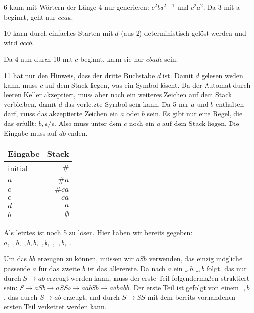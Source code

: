 \documentclass{article}
\begin{document}
\bigskip

6 kann mit Wörtern der Länge 4 nur generieren: $c^2ba^{2-1}$ und $c^2a^2$. Da 3 mit a beginnt, geht nur $ccaa$.

\bigskip

10 kann durch einfaches Starten mit $d$ (aus 2) deterministisch gelöst werden und wird $dccb$.

\bigskip

Da 4 nun durch 10 mit $c$ beginnt, kann sie nur $cbadc$ sein.

\bigskip

11 hat nur den Hinweis, dass der dritte Buchstabe $d$ ist. Damit $d$ gelesen weden kann, muss $c$ auf dem Stack liegen, was ein Symbol löscht. Da der Automat durch leeren Keller akzeptiert, muss aber noch ein weiteres Zeichen auf dem Stack verbleiben, damit $d$ das vorletzte Symbol sein kann. Da 5 nur $a$ und $b$ enthalten darf, muss das akzeptierte Zeichen ein $a$ oder $b$ sein. Es gibt nur eine Regel, die das erfüllt: $b,a/\epsilon$. Also muss unter dem $c$ noch ein $a$ auf dem Stack liegen. Die Eingabe muss auf $db$ enden.

\begin{table*}[ht]
	\centering
		\begin{tabular}{l|r}
      Eingabe & Stack \\
      \hline
      initial & $\#$ \\
      $a$ & $\# a$ \\
      $c$ & $\# ca$ \\
      $\epsilon$ & $ca$ \\
      $d$ & $a$ \\
      $b$ & $\emptyset$
		\end{tabular}
\end{table*}

\bigskip

Als letztes ist noch 5 zu lösen. Hier haben wir bereits gegeben: \\ $a,\_,b,\_,b,b,\_,b,\_,\_,b,\_$. 

Um das $bb$ erzeugen zu können, müssen wir $aSb$ verwenden, das einzig mögliche passende $a$ für das zweite $b$ ist das allererste. Da nach $a$ ein $\_,b,\_,b$ folgt, das nur durch $S\rightarrow ab$ erzeugt werden kann, muss der erste Teil folgendermaßen struktiert sein: $S \rightarrow aSb \rightarrow aSSb \rightarrow aabSb \rightarrow aababb$.
Der erste Teil ist gefolgt von einem $\_,b$, das durch $S \rightarrow ab$ erzeugt, und durch $S \rightarrow SS$ mit dem bereits vorhandenen ersten Teil verkettet werden kann.
\end{document}
